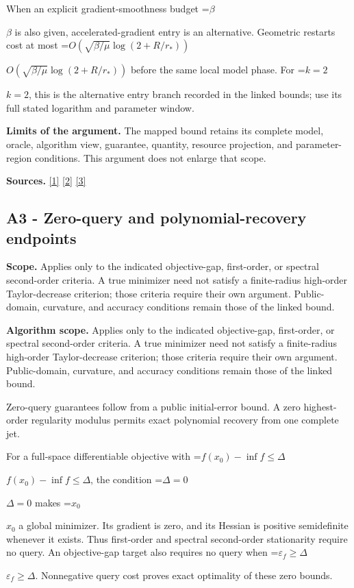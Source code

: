 \documentclass[10pt,a4paper]{article}
\newcommand{\AtlasMath}[1]{\par\begingroup\centering\setbox0=\hbox{$\displaystyle #1$}\ifdim\wd0>1.4\linewidth\typeout{ATLAS WIDE FORMULA: \the\wd0}\fi\ifdim\wd0>\linewidth\resizebox{\linewidth}{!}{\box0}\else\box0\fi\par\endgroup}
\newcommand{\AtlasInlineMath}[1]{\begingroup\setbox0=\hbox{$#1$}\ifdim\wd0>.4\linewidth\endgroup\AtlasMath{#1}\else\endgroup$#1$\fi}
\begin{document}
When an explicit gradient-smoothness budget \AtlasInlineMath{\beta} is also given, accelerated-gradient entry is an alternative. Geometric restarts cost at most \AtlasInlineMath{O(\sqrt{\beta/\mu}\log(2+R/r_*))} before the same local model phase. For \AtlasInlineMath{k=2}, this is the alternative entry branch recorded in the linked bounds; use its full stated logarithm and parameter window.

\textbf{Limits of the argument.} The mapped bound retains its complete model, oracle, algorithm view, guarantee, quantity, resource projection, and parameter-region conditions. This argument does not enlarge that scope.

\textbf{Sources.} \href{https://arxiv.org/pdf/2205.09647v1}{[1]} \href{https://arxiv.org/pdf/2010.06642v2}{[2]} \href{https://arxiv.org/pdf/1705.07260v2}{[3]}

\subsection{A3 - Zero-query and polynomial-recovery endpoints}
\textbf{Scope.} Applies only to the indicated objective-gap, first-order, or spectral second-order criteria. A true minimizer need not satisfy a finite-radius high-order Taylor-decrease criterion; those criteria require their own argument. Public-domain, curvature, and accuracy conditions remain those of the linked bound.

\textbf{Algorithm scope.} Applies only to the indicated objective-gap, first-order, or spectral second-order criteria. A true minimizer need not satisfy a finite-radius high-order Taylor-decrease criterion; those criteria require their own argument. Public-domain, curvature, and accuracy conditions remain those of the linked bound.

Zero-query guarantees follow from a public initial-error bound. A zero highest-order regularity modulus permits exact polynomial recovery from one complete jet.

For a full-space differentiable objective with \AtlasInlineMath{f(x_0)-\inf f\le\Delta}, the condition \AtlasInlineMath{\Delta=0} makes \AtlasInlineMath{x_0} a global minimizer. Its gradient is zero, and its Hessian is positive semidefinite whenever it exists. Thus first-order and spectral second-order stationarity require no query. An objective-gap target also requires no query when \AtlasInlineMath{\varepsilon_f\ge\Delta}. Nonnegative query cost proves exact optimality of these zero bounds.
\end{document}

